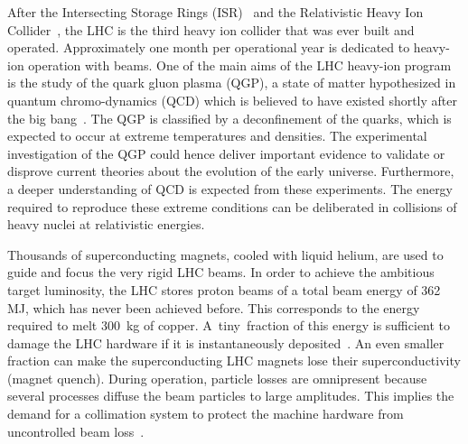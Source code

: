 After the Intersecting Storage Rings (ISR)~\cite{ISRref} and the Relativistic Heavy Ion Collider~\cite{HahnNIM03}, the LHC is the third heavy ion collider that was ever built and operated. Approximately one month per operational year is dedicated to heavy-ion operation with \lead beams. One of the main aims of the LHC heavy-ion program is the study of the quark gluon plasma (QGP), a state of matter hypothesized in quantum chromo-dynamics (QCD) which is believed to have existed shortly after the big bang~\cite{qgp1}. The QGP is classified by a deconfinement of the quarks, which is expected to occur at extreme temperatures and densities. The experimental investigation of the QGP could hence deliver important evidence to validate or disprove current theories about the evolution of the early universe. Furthermore, a deeper understanding of QCD is expected from these experiments. The energy required to reproduce these extreme conditions can be deliberated in collisions of heavy nuclei at relativistic energies.


Thousands of superconducting magnets, cooled with liquid helium, are used to guide and focus the very rigid LHC beams. In order to achieve the ambitious target luminosity, the LHC stores proton beams of a total beam energy of 362\,MJ, which has never been achieved before. This corresponds to the energy required to melt 300~kg of copper. \mbox{A tiny fraction} of this energy is sufficient to damage the LHC hardware if it is instantaneously deposited~\cite{braccothesis}. An even smaller fraction can make the superconducting LHC magnets lose their \mbox{superconductivity} (magnet quench). During operation, particle losses are omnipresent because several processes diffuse the beam particles to large amplitudes. This implies the demand for a collimation system to protect the machine hardware from uncontrolled beam loss~\citedr. 
\vspace{0.2cm}
\newpage

